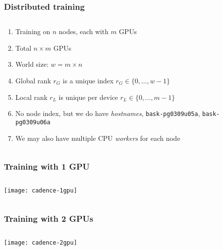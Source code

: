 \documentclass[
	notes=none,
	aspectratio=169
]{beamer}
\begin{document}
\begin{frame}
\frametitle{Distributed training}

\begin{columns}[T]
\begin{column}[T]{1.0\textwidth}
\setlength{\parskip}{0.5em}

\vspace{0.0cm}
\begin{enumerate}
\setlength{\parskip}{0.5em}
\item Training on $n$ nodes, each with $m$ GPUs
\item Total $n \times m$ GPUs
\item World size: $w = m \times n$
\item Global rank $r_G$ is a unique index $r_G \in \{ 0, \ldots, w - 1 \}$
\item Local rank $r_L$ is unique per device $r_L \in \{ 0, \ldots, m - 1 \}$
\item No node index, but we do have {\it hostnames}, \eg\/ {\tt bask-pg0309u05a}, {\tt bask-pg0309u06a}
\item We may also have multiple CPU {\it workers\/} for each node
\end{enumerate}

\end{column}
\end{columns}

\end{frame}
\note{
}


\begin{frame}
\frametitle{Training with 1 GPU}

\begin{columns}[T]
\begin{column}[T]{1.0\textwidth}
\setlength{\parskip}{0.5em}

\vspace{0.0cm}
\texttt{[image: cadence-1gpu]}


\end{column}
\end{columns}

\end{frame}
\note{
}


\begin{frame}
\frametitle{Training with 2 GPUs}

\begin{columns}[T]
\begin{column}[T]{1.0\textwidth}
\setlength{\parskip}{0.5em}

\vspace{0.0cm}
\texttt{[image: cadence-2gpu]}


\end{column}
\end{columns}

\end{frame}
\note{
}
\end{document}

